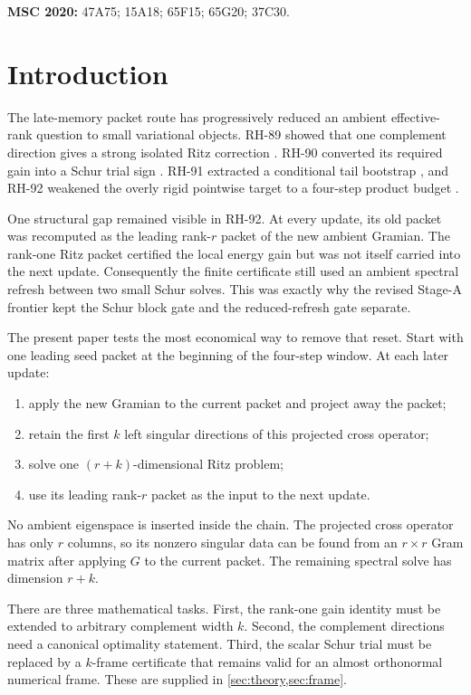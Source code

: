 \documentclass[11pt]{article}
\theoremstyle{definition}
\theoremstyle{remark}
\begin{document}
\medskip
\noindent\textbf{MSC 2020:} 47A75; 15A18; 65F15; 65G20; 37C30.

\section{Introduction}

The late-memory packet route has progressively reduced an ambient
effective-rank question to small variational objects.  RH-89 showed that one
complement direction gives a strong isolated Ritz correction
\citep{WangRitz2026}.  RH-90 converted its required gain into a Schur trial
sign \citep{WangSchur2026}.  RH-91 extracted a conditional tail bootstrap
\citep{WangPacketReview2026}, and RH-92 weakened the overly rigid pointwise
target to a four-step product budget \citep{WangBlockBudget2026}.

One structural gap remained visible in RH-92.  At every update, its old
packet was recomputed as the leading rank-$r$ packet of the new ambient
Gramian.  The rank-one Ritz packet certified the local energy gain but was not
itself carried into the next update.  Consequently the finite certificate
still used an ambient spectral refresh between two small Schur solves.  This
was exactly why the revised Stage-A frontier kept the Schur block gate and
the reduced-refresh gate separate.

The present paper tests the most economical way to remove that reset.  Start
with one leading seed packet at the beginning of the four-step window.  At
each later update:

\begin{enumerate}[leftmargin=2em]
\item apply the new Gramian to the current packet and project away the packet;
\item retain the first $k$ left singular directions of this projected cross
operator;
\item solve one $(r+k)$-dimensional Ritz problem;
\item use its leading rank-$r$ packet as the input to the next update.
\end{enumerate}

No ambient eigenspace is inserted inside the chain.  The projected cross
operator has only $r$ columns, so its nonzero singular data can be found from
an $r\times r$ Gram matrix after applying $G$ to the current packet.  The
remaining spectral solve has dimension $r+k$.

There are three mathematical tasks.  First, the rank-one gain identity must
be extended to arbitrary complement width $k$.  Second, the complement
directions need a canonical optimality statement.  Third, the scalar Schur
trial must be replaced by a $k$-frame certificate that remains valid for an
almost orthonormal numerical frame.  These are supplied in
\cref{sec:theory,sec:frame}.
\end{document}
